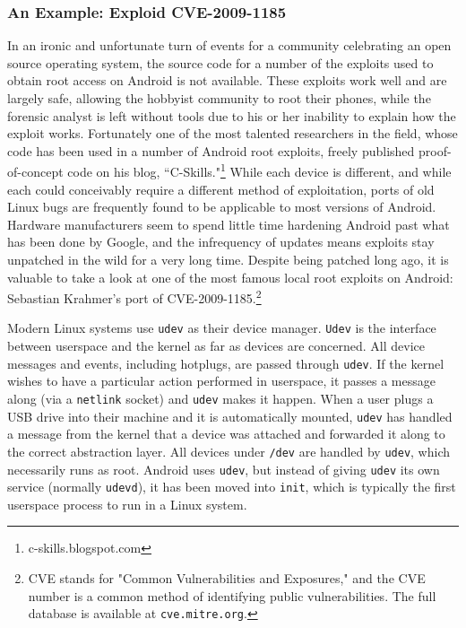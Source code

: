 \subsubsection{An Example: Exploid CVE-2009-1185}
In an ironic and unfortunate turn of events for
a community celebrating an open source operating system, the source code for a number of the exploits used to obtain root access on
Android is not available.  These exploits work well and are largely safe, allowing the hobbyist community to root their phones,
while the forensic analyst is left without tools due to his or her inability to explain how the exploit works.  Fortunately one of
the most talented researchers in the field, whose code has been used in a number of Android root exploits, freely
published proof-of-concept code on his blog,
``C-Skills."\footnote{c-skills.blogspot.com}  While each device is different, and while each could conceivably require a different
method of exploitation, ports of old Linux bugs are frequently found to be applicable to most versions of Android.  Hardware
manufacturers seem to spend little time hardening Android past what has been done by Google, and the infrequency of updates means
exploits stay unpatched in the wild for a very long time. Despite being patched long ago, it is valuable to take a
look at one of the most famous local root exploits on Android: Sebastian Krahmer's port of CVE-2009-1185.\footnote{CVE stands for
"Common Vulnerabilities and Exposures," and the CVE number is a common method of identifying public vulnerabilities. The full 
database is available at \texttt{cve.mitre.org}. }
 
Modern Linux systems use \texttt{udev} as their device manager.  \texttt{Udev} is the interface between userspace and the kernel as
far as devices are concerned.  All device messages and events, including hotplugs, are passed through \texttt{udev}.  If the kernel
wishes to have a particular action performed in userspace, it passes a message along (via a \texttt{netlink} socket) and
\texttt{udev} makes it happen.  When a user plugs a USB drive into their machine and it is automatically mounted, \texttt{udev} has
handled a message from the kernel that a device was attached and forwarded it along to the correct abstraction layer.  All devices
under \texttt{/dev} are handled by \texttt{udev}, which necessarily runs as root.  Android uses \texttt{udev}, but instead
of giving \texttt{udev} its own service (normally \texttt{udevd}), it has been moved into \texttt{init}, which is typically the
first userspace process to run in a Linux system.

